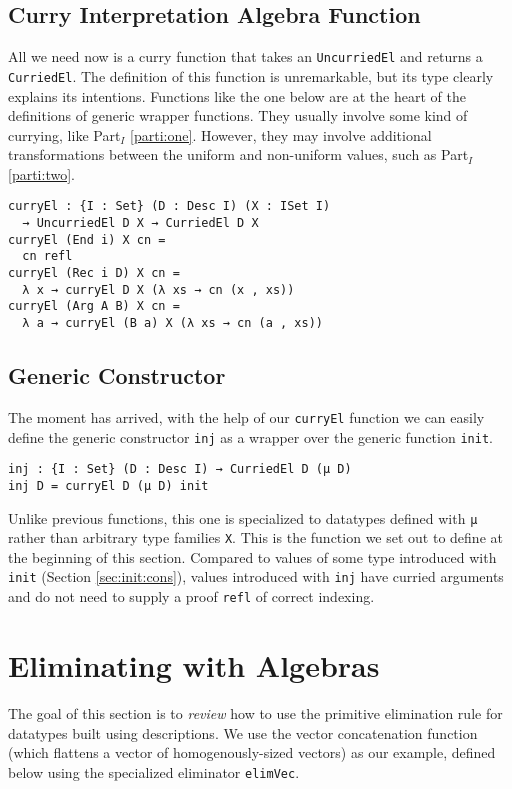 \documentclass[preprint,nonatbib]{sigplanconf}
\newcommand{\refsec}[1]{Section \ref{sec:#1}}
\newcommand{\refparti}[1]{Part$_I$ \ref{parti:#1}}
\begin{document}
\subsection{Curry Interpretation Algebra Function}

All we need now is a curry function that takes an
{\tt UncurriedEl} and returns a {\tt CurriedEl}. The definition of
this function is unremarkable, but its type clearly explains its
intentions. Functions like the one below are at the heart of the
definitions of generic wrapper functions. They usually involve some
kind of currying, like \refparti{one}. However, they may involve
additional transformations between the uniform and non-uniform values,
such as \refparti{two}.

\begin{verbatim}
curryEl : {I : Set} (D : Desc I) (X : ISet I)
  → UncurriedEl D X → CurriedEl D X
curryEl (End i) X cn =
  cn refl
curryEl (Rec i D) X cn =
  λ x → curryEl D X (λ xs → cn (x , xs))
curryEl (Arg A B) X cn =
  λ a → curryEl (B a) X (λ xs → cn (a , xs))
\end{verbatim}

\subsection{Generic Constructor}

The moment has arrived, with the help of our {\tt curryEl} function we
can easily define the generic constructor {\tt inj} as a wrapper over
the generic function {\tt init}.

\begin{verbatim}
inj : {I : Set} (D : Desc I) → CurriedEl D (μ D)
inj D = curryEl D (μ D) init
\end{verbatim}

Unlike previous functions, this one is specialized to datatypes
defined with {\tt μ} rather than arbitrary type families {\tt X}. This
is the function we set out to define at the beginning of this section.
Compared to values of some type introduced with {\tt init} (\refsec{init:cons}),
values introduced with {\tt inj} have curried arguments and do not
need to supply a proof {\tt refl} of correct indexing.

\section{Eliminating with Algebras}
\label{sec:ind}

The goal of this section is to {\it review} how to use the primitive
elimination rule for datatypes built using descriptions. We use
the vector concatenation function (which flattens a vector of
homogenously-sized vectors) as our example, defined below using the
specialized eliminator {\tt elimVec}.
\end{document}

